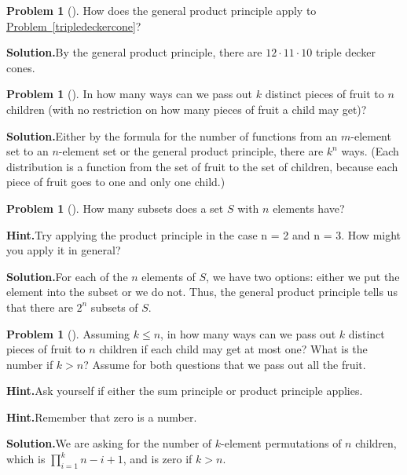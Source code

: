 \documentclass[10pt,]{book}
\theoremstyle{plain}
\theoremstyle{definition}
\newtheorem{activity}[project]{Problem}
\theoremstyle{definition}
\numberwithin{equation}{chapter}
\begin{document}
\begin{activity}[]\label{activity-16}
How does the general product principle apply to \hyperref[tripledeckercone]{Problem~\ref{tripledeckercone}}?%
\par\medskip\noindent%
\textbf{Solution.}\quad By the general product principle, there are \(12\cdot 11\cdot 10\) triple decker cones.%
\end{activity}
\begin{activity}[]\label{activity-17}
In how many ways can we pass out \(k\) distinct pieces of fruit to \(n\) children (with no restriction on how many pieces of fruit a child may get)?%
\par\medskip\noindent%
\textbf{Solution.}\quad Either by the formula for the number of functions from an \(m\)-element set to an \(n\)-element set or the general product principle, there are \(k^n\) ways. (Each distribution is a function from the set of fruit to the set of children, because each piece of fruit goes to one and only one child.)%
\end{activity}
\begin{activity}[]\label{SubsetsFirstTime}
How many subsets does a set \(S\) with \(n\) elements have?%
\par\medskip\noindent%
\textbf{Hint.}\quad Try applying the product principle in the case n = 2 and n = 3. How might you apply it in general?%
\par\medskip\noindent%
\textbf{Solution.}\quad For each of the \(n\) elements of \(S\), we have two options: either we put the element into the subset or we do not. Thus, the general product principle tells us that there are \(2^n\) subsets of \(S\).%
\end{activity}
\begin{activity}[]\label{activity-19}
Assuming \(k\le n\), in how many ways can we pass out \(k\) distinct pieces of fruit to \(n\) children if each child may get at most one? What is the number if \(k>n\)? Assume for both questions that we pass out all the fruit.%
\par\medskip\noindent%
\textbf{Hint.}\quad Ask yourself if either the sum principle or product principle applies.%
\par\medskip\noindent%
\textbf{Hint.}\quad Remember that zero is a number.%
\par\medskip\noindent%
\textbf{Solution.}\quad We are asking for the number of \(k\)-element permutations of \(n\) children, which is \(\prod_{i=1}^k n-i+1\), and is zero if \(k>n\).%
\end{activity}
\end{document}
